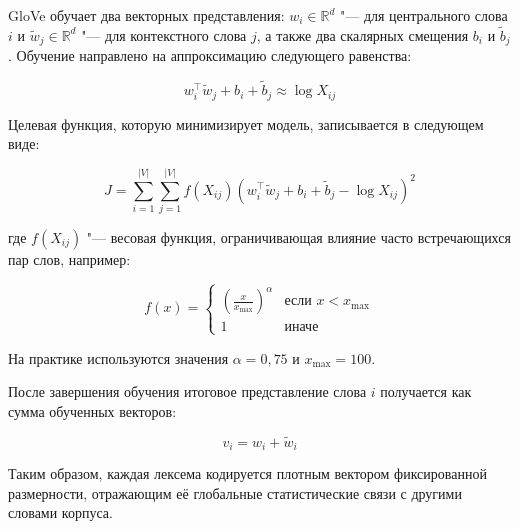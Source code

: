 \documentclass[coursework]{SCWorks}
\begin{document}
GloVe обучает два векторных представления: $w_i \in \mathbb{R}^d$ "--- для центрального слова $i$ и $\tilde{w}_j \in \mathbb{R}^d$ "--- для контекстного слова $j$, а также два скалярных смещения $b_i$ и $\tilde{b}_j$. Обучение направлено на аппроксимацию следующего равенства:

\[
w_i^\top \tilde{w}_j + b_i + \tilde{b}_j \approx \log X_{ij}
\]

Целевая функция, которую минимизирует модель, записывается в следующем виде:

\[
J = \sum_{i=1}^{|V|} \sum_{j=1}^{|V|} f(X_{ij}) \left(w_i^\top \tilde{w}_j + b_i + \tilde{b}_j - \log X_{ij} \right)^2
\]

где $f(X_{ij})$ "--- весовая функция, ограничивающая влияние часто встречающихся пар слов, например:

\[
f(x) = 
\begin{cases}
\left(\frac{x}{x_{\text{max}}}\right)^\alpha & \text{если } x < x_{\text{max}} \\
1 & \text{иначе}
\end{cases}
\]

На практике используются значения $\alpha = 0{,}75$ и $x_{\text{max}} = 100$\cite{pennington2014glove}.


После завершения обучения итоговое представление слова $i$ получается как сумма обученных векторов:

\[
v_i = w_i + \tilde{w}_i
\]

Таким образом, каждая лексема кодируется плотным вектором фиксированной размерности, отражающим её глобальные статистические связи с другими словами корпуса.



\end{document}
